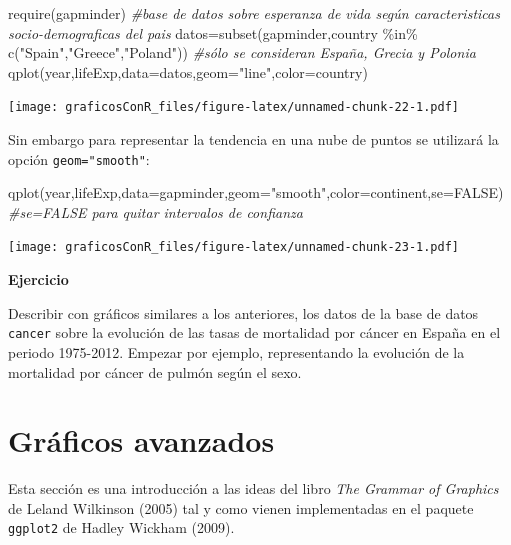 \documentclass[
]{article}
\newenvironment{Shaded}{\begin{snugshade}}{\end{snugshade}}
\newcommand{\AttributeTok}[1]{\textcolor[rgb]{0.77,0.63,0.00}{#1}}
\newcommand{\CommentTok}[1]{\textcolor[rgb]{0.56,0.35,0.01}{\textit{#1}}}
\newcommand{\ConstantTok}[1]{\textcolor[rgb]{0.00,0.00,0.00}{#1}}
\newcommand{\FunctionTok}[1]{\textcolor[rgb]{0.00,0.00,0.00}{#1}}
\newcommand{\NormalTok}[1]{#1}
\newcommand{\OtherTok}[1]{\textcolor[rgb]{0.56,0.35,0.01}{#1}}
\newcommand{\SpecialCharTok}[1]{\textcolor[rgb]{0.00,0.00,0.00}{#1}}
\newcommand{\StringTok}[1]{\textcolor[rgb]{0.31,0.60,0.02}{#1}}
\newcounter{ejcnt}[section]
\numberwithin{ejcnt}{section}
\newenvironment{ej}[1][]{%
	\refstepcounter{ejcnt}%
	\par\medskip%
	\noindent%
	\textbf{Ejercicio \theejcnt \;\;}%
	\rmfamily%
}{\medskip}
\begin{document}
\begin{Shaded}
\begin{Highlighting}[]
\FunctionTok{require}\NormalTok{(gapminder) }\CommentTok{\#base de datos sobre esperanza de vida según caracteristicas socio{-}demograficas del pais}
\NormalTok{datos}\OtherTok{=}\FunctionTok{subset}\NormalTok{(gapminder,country }\SpecialCharTok{\%in\%} \FunctionTok{c}\NormalTok{(}\StringTok{"Spain"}\NormalTok{,}\StringTok{"Greece"}\NormalTok{,}\StringTok{"Poland"}\NormalTok{)) }\CommentTok{\#sólo se consideran España, Grecia y Polonia}
\FunctionTok{qplot}\NormalTok{(year,lifeExp,}\AttributeTok{data=}\NormalTok{datos,}\AttributeTok{geom=}\StringTok{"line"}\NormalTok{,}\AttributeTok{color=}\NormalTok{country)}
\end{Highlighting}
\end{Shaded}

\texttt{[image: graficosConR\_files/figure-latex/unnamed-chunk-22-1.pdf]}

Sin embargo para representar la tendencia en una nube de puntos se utilizará la opción \texttt{geom="smooth"}:

\begin{Shaded}
\begin{Highlighting}[]
\FunctionTok{qplot}\NormalTok{(year,lifeExp,}\AttributeTok{data=}\NormalTok{gapminder,}\AttributeTok{geom=}\StringTok{"smooth"}\NormalTok{,}\AttributeTok{color=}\NormalTok{continent,}\AttributeTok{se=}\ConstantTok{FALSE}\NormalTok{) }\CommentTok{\#se=FALSE para quitar intervalos de confianza}
\end{Highlighting}
\end{Shaded}

\texttt{[image: graficosConR\_files/figure-latex/unnamed-chunk-23-1.pdf]}

\begin{ej}
Describir con gráficos similares a los anteriores, los datos de la base
de datos \texttt{cancer} sobre la evolución de las tasas de mortalidad
por cáncer en España en el periodo 1975-2012. Empezar por ejemplo,
representando la evolución de la mortalidad por cáncer de pulmón según
el sexo.
\end{ej}

\hypertarget{gruxe1ficos-avanzados}{%
\section{Gráficos avanzados}\label{gruxe1ficos-avanzados}}

Esta sección es una introducción a las ideas del libro \emph{The Grammar of Graphics} de Leland Wilkinson (2005) tal y como vienen implementadas en el paquete \texttt{ggplot2} de Hadley Wickham (2009).
\end{document}
